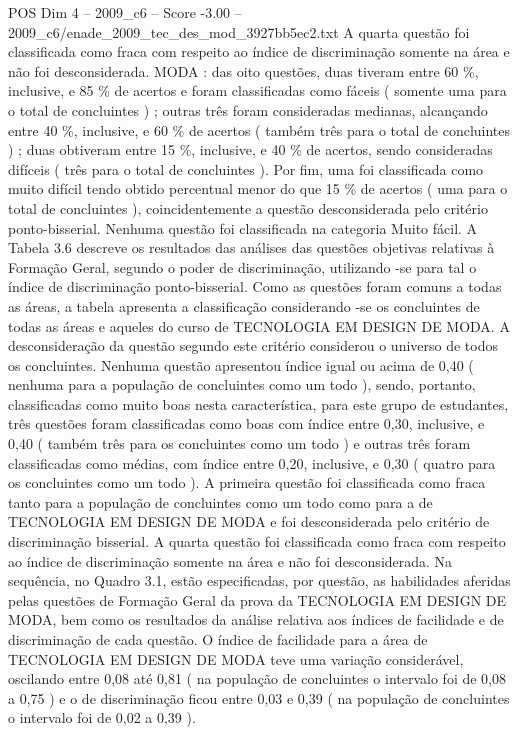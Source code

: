 \begin{textsample}{POS Dim 4 – 2009\_c6 – Score -3.00 – 2009\_c6/enade\_2009\_tec\_des\_mod\_3927bb5ec2.txt}
A quarta questão foi classificada como fraca com respeito ao índice de discriminação somente na área e não foi desconsiderada.
MODA : das oito questões, duas tiveram entre 60 \%, inclusive, e 85 \% de acertos e foram classificadas como fáceis ( somente uma para o total de concluintes ) ; outras três foram consideradas medianas, alcançando entre 40 \%, inclusive, e 60 \% de acertos ( também três para o total de concluintes ) ; duas obtiveram entre 15 \%, inclusive, e 40 \% de acertos, sendo consideradas difíceis ( três para o total de concluintes ).
Por fim, uma foi classificada como muito difícil tendo obtido percentual menor do que 15 \% de acertos ( uma para o total de concluintes ), coincidentemente a questão desconsiderada pelo critério ponto-bisserial.
Nenhuma questão foi classificada na categoria Muito fácil.
A Tabela 3.6 descreve os resultados das análises das questões objetivas relativas à Formação Geral, segundo o poder de discriminação, utilizando -se para tal o índice de discriminação ponto-bisserial.
Como as questões foram comuns a todas as áreas, a tabela apresenta a classificação considerando -se os concluintes de todas as áreas e aqueles do curso de TECNOLOGIA EM DESIGN DE MODA.
A desconsideração da questão segundo este critério considerou o universo de todos os concluintes.
Nenhuma questão apresentou índice igual ou acima de 0,40 ( nenhuma para a população de concluintes como um todo ), sendo, portanto, classificadas como muito boas nesta característica, para este grupo de estudantes, três questões foram classificadas como boas com índice entre 0,30, inclusive, e 0,40 ( também três para os concluintes como um todo ) e outras três foram classificadas como médias, com índice entre 0,20, inclusive, e 0,30 ( quatro para os concluintes como um todo ).
A primeira questão foi classificada como fraca tanto para a população de concluintes como um todo como para a de TECNOLOGIA EM DESIGN DE MODA e foi desconsiderada pelo critério de discriminação bisserial.
A quarta questão foi classificada como fraca com respeito ao índice de discriminação somente na área e não foi desconsiderada.
Na sequência, no Quadro 3.1, estão especificadas, por questão, as habilidades aferidas pelas questões de Formação Geral da prova da TECNOLOGIA EM DESIGN DE MODA, bem como os resultados da análise relativa aos índices de facilidade e de discriminação de cada questão.
O índice de facilidade para a área de TECNOLOGIA EM DESIGN DE MODA teve uma variação considerável, oscilando entre 0,08 até 0,81 ( na população de concluintes o intervalo foi de 0,08 a 0,75 ) e o de discriminação ficou entre 0,03 e 0,39 ( na população de concluintes o intervalo foi de 0,02 a 0,39 ).

\end{textsample}
